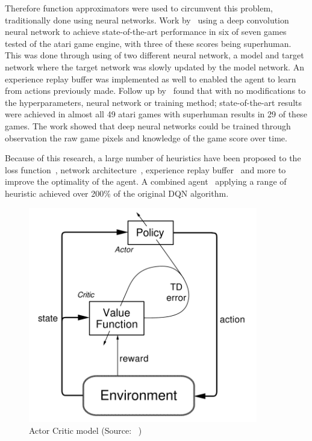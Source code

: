 Therefore function approximators were used to circumvent this problem, traditionally done using neural networks.
Work by~\cite{atari} using a deep convolution neural network to achieve state-of-the-art performance in six of seven
games tested of the atari game engine, with three of these scores being superhuman. This was done through using of two
different neural network, a model and target network where the target network was slowly updated by the model network.
An experience replay buffer was implemented as well to enabled the agent to learn from actions previously made.
Follow up by~\cite{mnih2015humanlevel} found that with no modifications to the hyperparameters, neural network or
training method; state-of-the-art results were achieved in almost all 49 atari games with superhuman results in 29 of
these games. The work showed that deep neural networks could be trained through observation the raw game pixels and
knowledge of the game score over time.

Because of this research, a large number of heuristics have been proposed to the loss function~\citep{doubledqn},
network architecture~\cite{duelingdqn}, experience replay buffer~\citep{prioritizedexperiencereplay} and more to
improve the optimality of the agent. A combined agent~\citep{rainbow} applying a range of heuristic achieved over
200\% of the original DQN algorithm.

\begin{figure}[h]
    \includegraphics[width=10cm]{figures/actor-critic.png}
    \caption{Actor Critic model (Source: ~\cite{Sutton1998})}
    \label{fig:actor-critic-model}
\end{figure}

